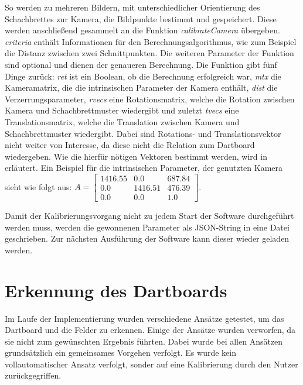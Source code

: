 So werden zu mehreren Bildern, mit unterschiedlicher Orientierung des Schachbrettes zur Kamera, die Bildpunkte bestimmt und gespeichert. Diese werden anschließend gesammelt an die Funktion \textit{calibrateCamera} übergeben. \textit{criteria} enthält Informationen für den Berechnungsalgorithmus, wie zum Beispiel die Distanz zwischen zwei Schnittpunkten. Die weiteren Parameter der Funktion sind optional und dienen der genaueren Berechnung.
Die Funktion gibt fünf Dinge zurück: \textit{ret} ist ein Boolean, ob die Berechnung erfolgreich war, \textit{mtx} die Kameramatrix, die die intrinsischen Parameter der Kamera enthält, \textit{dist} die Verzerrungsparameter, \textit{rvecs} eine Rotationsmatrix, welche die Rotation zwischen Kamera und Schachbrettmuster wiedergibt und zuletzt \textit{tvecs} eine Translationsmatrix, welche die Translation zwischen Kamera und Schachbrettmuster wiedergibt. Dabei sind Rotations- und Translationsvektor nicht weiter von Interesse, da diese nicht die Relation zum Dartboard wiedergeben. Wie die hierfür nötigen Vektoren bestimmt werden, wird in  erläutert. Ein Beispiel für die intrinsischen Parameter, der genutzten Kamera sieht wie folgt aus:
$A= 
\begin{bmatrix} 
1416.55 & 0.0 & 687.84 \\
0.0 & 1416.51 & 476.39 \\
0.0 & 0.0 & 1.0\end{bmatrix}$.

Damit der Kalibrierungsvorgang nicht zu jedem Start der Software durchgeführt werden muss, werden die gewonnenen Parameter als JSON-String in eine Datei geschrieben. Zur nächsten Ausführung der Software kann dieser wieder geladen werden. 


\section{Erkennung des Dartboards}
\label{sec:board}
%        
Im Laufe der Implementierung wurden verschiedene Ansätze getestet, um das Dartboard und die Felder zu erkennen. Einige der Ansätze wurden verworfen, da sie nicht  zum gewünschten Ergebnis führten. Dabei wurde bei allen Ansätzen grundsätzlich ein gemeinsames Vorgehen verfolgt. Es wurde kein vollautomatischer Ansatz verfolgt, sonder auf eine Kalibrierung durch den Nutzer zurückgegriffen. 


